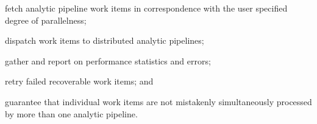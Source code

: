 \begin{description}
  \item fetch analytic pipeline work items in correspondence with the user specified degree of parallelness;
  \item dispatch work items to distributed analytic pipelines;
  \item gather and report on performance statistics and errors;
  \item retry failed recoverable work items; and
  \item guarantee that individual work items are not mistakenly simultaneously processed by more than one analytic pipeline.
\end{description}
